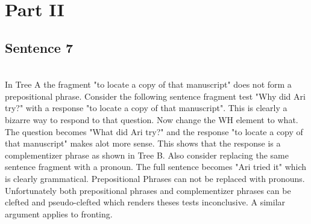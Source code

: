 \documentclass[20pt]{article}
\newcommand{\feature}[1]{\ensuremath{\left[ \text{#1} \right]}}
\newcommand{\treeScale}[0]{0.7}
\begin{document}
\section*{Part II}
\subsection*{Sentence 7}
 \\

In Tree A the fragment "to locate a copy of that manuscript" does not form a
prepositional phrase. Consider the following sentence fragment test "Why did
Ari try?" with a response "to locate a copy of that manuscript". This is clearly
a bizarre way to respond to that question. Now change the WH element to what.
The question becomes "What did Ari try?" and the response "to locate a copy of
that manuscript" makes alot more sense. This shows that the response is a
complementizer phrase as shown in Tree B. Also consider replacing the same sentence
fragment with a pronoun. The full sentence becomes "Ari tried it" which is
clearly grammatical. Prepositional Phrases can not be replaced with pronouns.
Unfortunately both prepositional phrases and complementizer phrases can be
clefted and pseudo-clefted which renders theses tests inconclusive. A similar
argument applies to fronting. \\
\end{document}
